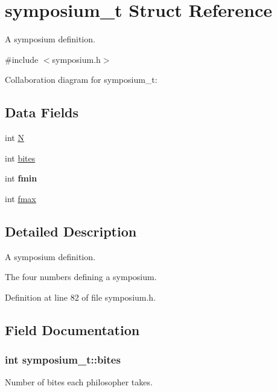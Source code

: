 \hypertarget{structsymposium__t}{}\section{symposium\+\_\+t Struct Reference}
\label{structsymposium__t}


A symposium definition.  




{\ttfamily \#include $<$symposium.\+h$>$}



Collaboration diagram for symposium\+\_\+t\+:
\subsection*{Data Fields}
\begin{DoxyCompactItemize}
\item 
int \hyperlink{structsymposium__t_a4e366c10036b2d89ebc2dbcdefba8999}{N}
\item 
int \hyperlink{structsymposium__t_a9ee1b978200b8a4b7c30b170c1f20643}{bites}
\item 
int {\bfseries fmin}\hypertarget{structsymposium__t_ab7af5af3a92d6c03bf916571a09d6aed}{}\label{structsymposium__t_ab7af5af3a92d6c03bf916571a09d6aed}

\item 
int \hyperlink{structsymposium__t_a038b49a350225fed31d5c148a9147ec6}{fmax}
\end{DoxyCompactItemize}


\subsection{Detailed Description}
A symposium definition. 

The four numbers defining a symposium. 

Definition at line 82 of file symposium.\+h.



\subsection{Field Documentation}
\subsubsection[{\texorpdfstring{bites}{bites}}]{\setlength{\rightskip}{0pt plus 5cm}int symposium\+\_\+t\+::bites}\hypertarget{structsymposium__t_a9ee1b978200b8a4b7c30b170c1f20643}{}\label{structsymposium__t_a9ee1b978200b8a4b7c30b170c1f20643}
Number of bites each philosopher takes. 

